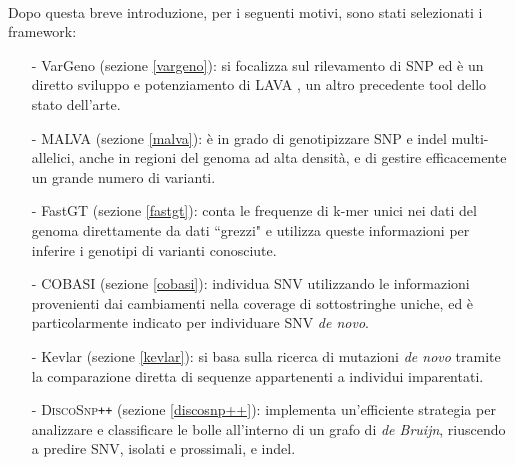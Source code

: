 \documentclass[../main.tex]{subfiles}
\begin{document}
\noindent
\\
Dopo questa breve introduzione, per i seguenti motivi, sono stati selezionati i framework:
\begin{itemize} 
\item[-] VarGeno (sezione \ref{vargeno}): \cite{sun-medvedev2018vargeno} si focalizza sul rilevamento di SNP ed è un diretto sviluppo e potenziamento di LAVA \cite{shajii2016lava}, un altro precedente tool dello stato dell'arte.
\item[-] MALVA (sezione \ref{malva}): \cite{bernardini2019malva} è in grado di genotipizzare SNP e indel multi-allelici, anche in regioni del genoma ad alta densità, e di gestire efficacemente un grande numero di varianti.
\item[-] FastGT (sezione \ref{fastgt}): \cite{pajuste2017fastgt} conta le frequenze di k-mer unici nei dati del genoma direttamente da dati ``grezzi" e utilizza queste informazioni per inferire i genotipi di varianti conosciute. 
\item[-] COBASI (sezione \ref{cobasi}): \cite{gomez-romero2018cobasi} individua SNV utilizzando le informazioni provenienti dai cambiamenti nella coverage di sottostringhe uniche, ed è particolarmente indicato per individuare SNV \textit{de novo}.
\item[-] Kevlar (sezione \ref{kevlar}): \cite{standage2019kevlar} si basa sulla ricerca di mutazioni \textit{de novo} tramite la comparazione diretta di sequenze appartenenti a individui imparentati.
\item[-] \textsc{DiscoSnp}\texttt{++} (sezione \ref{discosnp++}): \cite{peterlongo2017discosnp++} implementa un'efficiente strategia per analizzare e classificare le bolle all'interno di un grafo di \textit{de Bruijn}, riuscendo a predire SNV, isolati e prossimali, e indel.
\end{itemize} 
\end{document}
